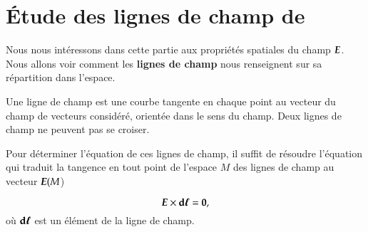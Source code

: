 \section{Étude des lignes de champ de \vece}
Nous nous intéressons dans cette partie aux propriétés spatiales du champ $\vece$.
Nous allons voir comment les \textbf{lignes de champ} nous renseignent sur sa répartition 
dans l'espace.

\begin{defn}
	Une ligne de champ est une courbe tangente en chaque point au vecteur 
	du champ de vecteurs considéré, orientée dans le sens du champ. Deux
	lignes de champ ne peuvent pas se croiser.
\end{defn}

Pour déterminer l'équation de ces lignes de champ, il suffit de résoudre l'équation
qui traduit la tangence en tout point de l'espace $M$ des lignes de champ 
au vecteur $\vece(M$)

\begin{equation}
	\vece \times \dl = \mitbf{0},
\end{equation}
où $\dl$ est un élément de la ligne de champ.



